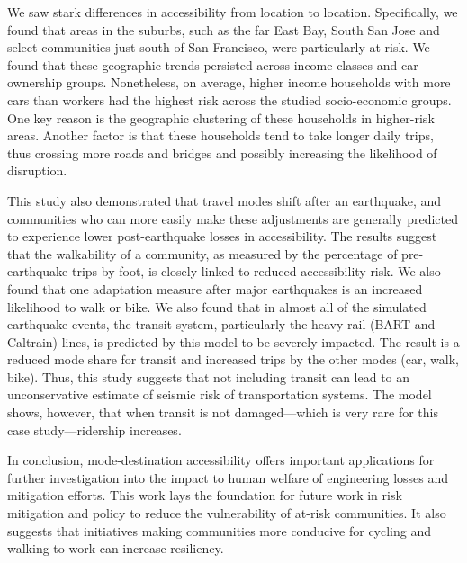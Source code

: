 
We saw stark differences in accessibility from location to location. Specifically, we found that areas in the suburbs, such as the far East Bay, South San Jose and select communities just south of San Francisco, were particularly at risk. We found that these geographic trends persisted across income classes and car ownership groups. Nonetheless, on average, higher income households with more cars than workers had the highest risk across the studied socio-economic groups. One key reason is the geographic clustering of these households in higher-risk areas. Another factor is that these households tend to take longer daily trips, thus crossing more roads and bridges and possibly increasing the likelihood of disruption.

This study also demonstrated that travel modes shift after an earthquake, and communities who can more easily make these adjustments are generally predicted to experience lower post-earthquake losses in accessibility. The results suggest that the walkability of a community, as measured by the percentage of pre-earthquake trips by foot, is closely linked to reduced accessibility risk. We also found that one adaptation measure after major earthquakes is an increased likelihood to walk or bike. We also found that in almost all of the simulated earthquake events, the transit system, particularly the heavy rail (BART and Caltrain) lines, is predicted by this model to be severely impacted. The result is a reduced mode share for transit and increased trips by the other modes (car, walk, bike). Thus, this study suggests that not including transit can lead to an unconservative estimate of seismic risk of transportation systems. The model shows, however, that when transit is not damaged---which is very rare for this case study---ridership increases.

In conclusion,  mode-destination accessibility offers important applications for further investigation into the impact to human welfare of engineering losses and mitigation efforts. 
This work lays the foundation for future work in risk mitigation and policy to reduce the vulnerability of at-risk communities. It also suggests that initiatives making communities more conducive for cycling and walking to work can increase resiliency.

